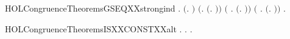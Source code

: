 \begin{SaveVerbatim}{HOLCongruenceTheoremsGSEQXXstrongind}
\HOLTokenTurnstile{} \HOLSymConst{\HOLTokenForall{}}.
        \ensuremath{(}\HOLTokenLambda{}. \ensuremath{)} \HOLSymConst{\HOLTokenConj{}} \ensuremath{(}\HOLSymConst{\HOLTokenForall{}}.  \ensuremath{(}\HOLTokenLambda{}. \ensuremath{)}\ensuremath{)} \HOLSymConst{\HOLTokenConj{}}
       \ensuremath{(}\HOLSymConst{\HOLTokenForall{}} .   \HOLSymConst{\HOLTokenConj{}}   \HOLSymConst{\HOLTokenImp{}}  \ensuremath{(}\HOLTokenLambda{}. \HOLSymConst{\ensuremath{\ldotp}} \ensuremath{)}\ensuremath{)} \HOLSymConst{\HOLTokenConj{}}
       \ensuremath{(}\HOLSymConst{\HOLTokenForall{}}   .
              \HOLSymConst{\HOLTokenConj{}}   \HOLSymConst{\HOLTokenConj{}}   \HOLSymConst{\HOLTokenConj{}}   \HOLSymConst{\HOLTokenImp{}}
             \ensuremath{(}\HOLTokenLambda{}. \HOLSymConst{\ensuremath{\ldotp}}  \HOLSymConst{\ensuremath{+}} \HOLSymConst{\ensuremath{\ldotp}} \ensuremath{)}\ensuremath{)} \HOLSymConst{\HOLTokenImp{}}
       \HOLSymConst{\HOLTokenForall{}}.   \HOLSymConst{\HOLTokenImp{}}  
\end{SaveVerbatim}
\newcommand{\HOLCongruenceTheoremsGSEQXXstrongind}{\UseVerbatim{HOLCongruenceTheoremsGSEQXXstrongind}}
\begin{SaveVerbatim}{HOLCongruenceTheoremsISXXCONSTXXalt}
\HOLTokenTurnstile{} \HOLSymConst{\HOLTokenForall{}}.   \HOLSymConst{\HOLTokenEquiv{}} \HOLSymConst{\HOLTokenExists{}}. \HOLSymConst{\HOLTokenForall{}}.   \HOLSymConst{\ensuremath{=}} 
\end{SaveVerbatim}
